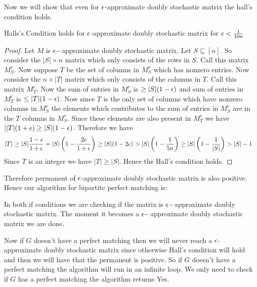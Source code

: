 Now we will show that even for $\epsilon$-approximate doubly stochastic matrix the hall's condition holds.
\begin{lemma}{}{}
	Halls's Condition holds for $\epsilon$-approximate doubly stochastic matrix for $\epsilon<\frac1{10n}$
\end{lemma}
\begin{proof}
	Let $M$ is $\epsilon-$approximate doubly stochastic matrix. Let $S\subseteq [n]$. So consider the $|S|\times n$ matrix which only consists of the rows in $S$. Call this matrix $M_S^r$. Now suppose $T$ be the set of columns in $M_S^r$ which has nonzero entries. Now consider the $n\times |T|$ matrix which only consists of the columns in $T$. Call this matrix $M_T^c$. Now the sum of entries in $M_S^r$ is $\geq |S|(1-\epsilon)$ and sum of entries in $M_T^c$ is $\leq |T|(1-\epsilon)$. Now since $T$ is the only set of columns which have nonzero columns in $M_S^r$ the elements which contributes to the sum of entries in $M_S^r$ are in the  $T$ columns in $M_S^r$. Since these elements are also present in $M_T^c$ we have $||T|(1+\epsilon)\geq |S|(1-\epsilon)$. Therefore we have $$|T|\geq |S|\frac{1-\epsilon}{1+\epsilon}=|S|\left(1-\frac{2\epsilon}{1+\epsilon}\right)\geq |S|(1-2\epsilon)>|S|\left(1-\frac1{5n}\right)\geq |S|\left(1-\frac1{|S|}\right)>|S|-1$$Since $T$ is an integer we have $|T|\geq |S|$. Hence the Hall's condition holds. 
\end{proof}

Therefore permanent of $\epsilon$-approximate doubly stochastic matrix is also positive. Hence our algorithm for bipartite perfect matching is:
\begin{algorithm}
	\DontPrintSemicolon
{}
\caption{}
\end{algorithm}


In both if conditions we are checking if the matrix is $\epsilon-$approximate doubly stochastic matrix. The moment it becomes a $\epsilon-$approximate doubly stochastic matrix we are done. 

Now if $G$ doesn't have a perfect matching then we will never reach a $\epsilon$-approximate doubly stochastic matrix since otherwise Hall's condition will hold and then we will have that the permanent is positive. So if $G$ doesn't have a perfect matching the algorithm will run in an infinite loop. We only need to check if $G$ has a perfect matching the algorithm returns Yes.

